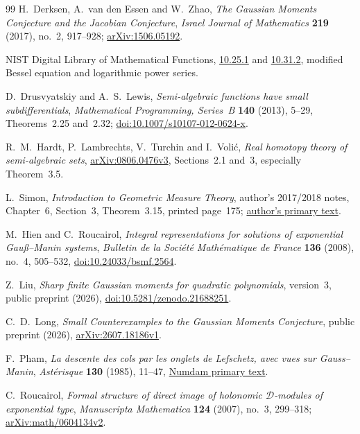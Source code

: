 \documentclass[11pt]{article}
\theoremstyle{definition}\newtheorem{definition}[theorem]{Definition}
\theoremstyle{remark}\newtheorem{remark}[theorem]{Remark}
\begin{document}
\begin{thebibliography}{99}
H.~Derksen, A.~van den Essen and W.~Zhao,
\emph{The Gaussian Moments Conjecture and the Jacobian Conjecture},
\emph{Israel Journal of Mathematics} \textbf{219} (2017), no.~2,
917--928; \href{https://arxiv.org/abs/1506.05192}{arXiv:1506.05192}.

NIST Digital Library of Mathematical Functions,
\href{https://dlmf.nist.gov/10.25.E1}{10.25.1} and
\href{https://dlmf.nist.gov/10.31.E2}{10.31.2},
modified Bessel equation and logarithmic power series.

D.~Drusvyatskiy and A.~S.~Lewis, \emph{Semi-algebraic functions have
small subdifferentials}, \emph{Mathematical Programming, Series~B}
\textbf{140} (2013), 5--29, Theorems~2.25 and~2.32;
\href{https://doi.org/10.1007/s10107-012-0624-x}{doi:10.1007/s10107-012-0624-x}.

R.~M.~Hardt, P.~Lambrechts, V.~Turchin and I.~Voli\'c,
\emph{Real homotopy theory of semi-algebraic sets},
\href{https://arxiv.org/abs/0806.0476v3}{arXiv:0806.0476v3},
Sections~2.1 and~3, especially Theorem~3.5.

L.~Simon, \emph{Introduction to Geometric Measure Theory},
author's 2017/2018 notes, Chapter~6, Section~3, Theorem~3.15,
printed page~175;
\href{https://math.stanford.edu/~lms/ntu-gmt-text.pdf}{author's primary text}.

M.~Hien and C.~Roucairol, \emph{Integral representations for solutions
of exponential Gau\ss--Manin systems},
\emph{Bulletin de la Soci\'et\'e Math\'ematique de France}
\textbf{136} (2008), no.~4, 505--532,
\href{https://doi.org/10.24033/bsmf.2564}{doi:10.24033/bsmf.2564}.

Z.~Liu, \emph{Sharp finite Gaussian moments for quadratic polynomials},
version~3, public preprint (2026),
\href{https://doi.org/10.5281/zenodo.21688251}{doi:10.5281/zenodo.21688251}.

C.~D.~Long, \emph{Small Counterexamples to the Gaussian Moments Conjecture},
public preprint (2026),
\href{https://arxiv.org/abs/2607.18186v1}{arXiv:2607.18186v1}.

F.~Pham, \emph{La descente des cols par les onglets de Lefschetz,
avec vues sur Gauss--Manin}, \emph{Ast\'erisque} \textbf{130}
(1985), 11--47,
\href{https://numdam.org/item/AST_1985__130__11_0/}{Numdam primary text}.

C.~Roucairol, \emph{Formal structure of direct image of holonomic
$\mathcal D$-modules of exponential type},
\emph{Manuscripta Mathematica} \textbf{124} (2007), no.~3, 299--318;
\href{https://arxiv.org/abs/math/0604134v2}{arXiv:math/0604134v2}.


\end{thebibliography}
\end{document}
